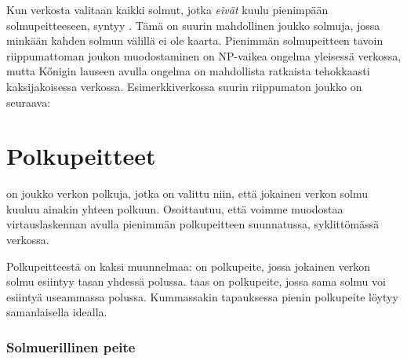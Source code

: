 
Kun verkosta valitaan kaikki solmut,
jotka \emph{eivät} kuulu pienimpään
solmupeitteeseen, syntyy 
.
Tämä on suurin mahdollinen joukko solmuja,
jossa minkään kahden solmun
välillä ei ole kaarta.
Pienimmän solmupeitteen tavoin
riippumattoman joukon muodostaminen on
NP-vaikea ongelma yleisessä verkossa,
mutta Kőnigin lauseen avulla
ongelma on mahdollista ratkaista
tehokkaasti kaksijakoisessa verkossa.
Esimerkkiverkossa suurin riippumaton joukko on seuraava:

\begin{center}
\end{center}

\section{Polkupeitteet}


 on joukko verkon polkuja,
jotka on valittu niin, että jokainen verkon solmu kuuluu
ainakin yhteen polkuun.
Osoittautuu, että voimme muodostaa
virtauslaskennan avulla
pienimmän polkupeitteen suunnatussa,
syklittömässä verkossa.

Polkupeitteestä on kaksi muunnelmaa:
 on polkupeite,
jossa jokainen verkon solmu esiintyy tasan yhdessä polussa.
 taas on polkupeite, jossa sama solmu voi
esiintyä useammassa polussa.
Kummassakin tapauksessa pienin polkupeite löytyy
samanlaisella idealla.

\subsubsection{Solmuerillinen peite}

